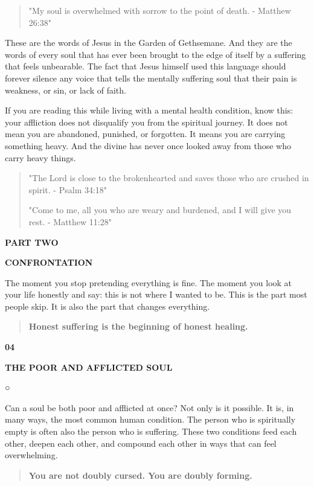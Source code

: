 \begin{quote}
"My soul is overwhelmed with sorrow to the point of death. - Matthew
26:38"
\end{quote}

These are the words of Jesus in the Garden of Gethsemane. And they are
the words of every soul that has ever been brought to the edge of itself
by a suffering that feels unbearable. The fact that Jesus himself used
this language should forever silence any voice that tells the mentally
suffering soul that their pain is weakness, or sin, or lack of faith.

If you are reading this while living with a mental health condition,
know this: your affliction does not disqualify you from the spiritual
journey. It does not mean you are abandoned, punished, or forgotten. It
means you are carrying something heavy. And the divine has never once
looked away from those who carry heavy things.

\begin{quote}
"The Lord is close to the brokenhearted and saves those who are crushed
in spirit. - Psalm 34:18"

"Come to me, all you who are weary and burdened, and I will give you
rest. - Matthew 11:28"
\end{quote}

\textbf{PART TWO}

\textbf{CONFRONTATION}

The moment you stop pretending everything is fine. The moment you look
at your life honestly and say: this is not where I wanted to be. This is
the part most people skip. It is also the part that changes everything.

\begin{quote}
\textbf{Honest suffering is the beginning of honest healing.}
\end{quote}

\textbf{04}

\textbf{THE POOR AND AFFLICTED SOUL}

○

Can a soul be both poor and afflicted at once? Not only is it possible.
It is, in many ways, the most common human condition. The person who is
spiritually empty is often also the person who is suffering. These two
conditions feed each other, deepen each other, and compound each other
in ways that can feel overwhelming.

\begin{quote}
\textbf{You are not doubly cursed. You are doubly forming.}
\end{quote}

